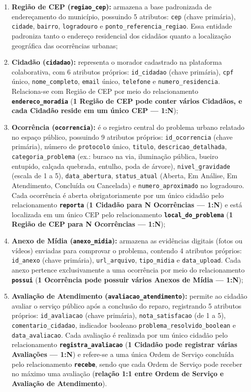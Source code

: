 \documentclass[12pt,a4paper]{article}
\begin{document}
\begin{enumerate}
  \item \textbf{Região de CEP (\texttt{regiao\_cep}):} armazena a base padronizada de endereçamento do município, possuindo 5 atributos: \texttt{cep} (chave primária), \texttt{cidade}, \texttt{bairro}, \texttt{logradouro} e \texttt{ponto\_referencia\_regiao}. Essa entidade padroniza tanto o endereço residencial dos cidadãos quanto a localização geográfica das ocorrências urbanas;
  \item \textbf{Cidadão (\texttt{cidadao}):} representa o morador cadastrado na plataforma colaborativa, com 6 atributos próprios: \texttt{id\_cidadao} (chave primária), \texttt{cpf} único, \texttt{nome\_completo}, \texttt{email} único, \texttt{telefone} e \texttt{numero\_residencia}. Relaciona-se com Região de CEP por meio do relacionamento \textbf{\texttt{endereco\_moradia}} (\textbf{1 Região de CEP pode conter vários Cidadãos, e cada Cidadão reside em um único CEP --- 1:N});
  \item \textbf{Ocorrência (\texttt{ocorrencia}):} é o registro central do problema urbano relatado no espaço público, possuindo 9 atributos próprios: \texttt{id\_ocorrencia} (chave primária), número de \texttt{protocolo} único, \texttt{titulo}, \texttt{descricao\_detalhada}, \texttt{categoria\_problema} (ex.: buraco na via, iluminação pública, bueiro entupido, calçada quebrada, entulho, poda de árvore), \texttt{nivel\_gravidade} (escala de 1 a 5), \texttt{data\_abertura}, \texttt{status\_atual} (Aberta, Em Análise, Em Atendimento, Concluída ou Cancelada) e \texttt{numero\_aproximado} no logradouro. Cada ocorrência é aberta obrigatoriamente por um único cidadão pelo relacionamento \textbf{\texttt{reporta}} (\textbf{1 Cidadão para N Ocorrências --- 1:N}) e está localizada em um único CEP pelo relacionamento \textbf{\texttt{local\_do\_problema}} (\textbf{1 Região de CEP para N Ocorrências --- 1:N});
  \item \textbf{Anexo de Mídia (\texttt{anexo\_midia}):} armazena as evidências digitais (fotos ou vídeos) enviadas para comprovar o problema, contendo 4 atributos próprios: \texttt{id\_anexo} (chave primária), \texttt{url\_arquivo}, \texttt{tipo\_midia} e \texttt{data\_upload}. Cada anexo pertence exclusivamente a uma ocorrência por meio do relacionamento \textbf{\texttt{possui}} (\textbf{1 Ocorrência pode possuir vários Anexos de Mídia --- 1:N});
  \item \textbf{Avaliação de Atendimento (\texttt{avaliacao\_atendimento}):} permite ao cidadão avaliar o serviço público após a conclusão do reparo, registrando 5 atributos próprios: \texttt{id\_avaliacao} (chave primária), \texttt{nota\_satisfacao} (de 1 a 5), \texttt{comentario\_cidadao}, indicador booleano \texttt{problema\_resolvido\_boolean} e \texttt{data\_avaliacao}. Cada avaliação é realizada por um único cidadão pelo relacionamento \textbf{\texttt{registra\_avaliacao}} (\textbf{1 Cidadão pode registrar várias Avaliações --- 1:N}) e refere-se a uma única Ordem de Serviço concluída pelo relacionamento \textbf{\texttt{recebe}}, sendo que cada Ordem de Serviço pode receber no máximo uma avaliação (\textbf{relação 1:1 entre Ordem de Serviço e Avaliação de Atendimento}).
\end{enumerate}
\end{document}
